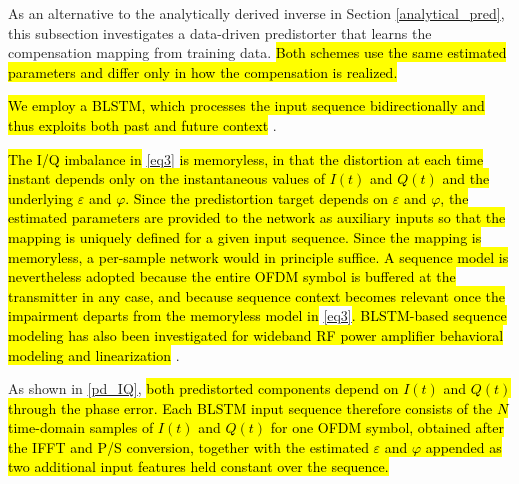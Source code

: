 \documentclass[lettersize,journal]{IEEEtran}
\begin{document}
As an alternative to the analytically derived inverse in Section \ref{analytical_pred}, this subsection investigates a data-driven predistorter that learns the compensation mapping from training data.
\hl{Both schemes use the same estimated parameters and differ only in how the compensation is realized.}

\hl{We employ a BLSTM, which processes the input sequence bidirectionally and thus exploits both past and future context} \cite{REF10}.
 
\hl{The I/Q imbalance in} \eqref{eq3} \hl{is memoryless, in that the distortion at each time instant depends only on the instantaneous values of $I(t)$ and $Q(t)$ and the underlying $\varepsilon$ and $\varphi$.
Since the predistortion target depends on $\varepsilon$ and $\varphi$, the estimated parameters are provided to the network as auxiliary inputs so that the mapping is uniquely defined for a given input sequence.
Since the mapping is memoryless, a per-sample network would in principle suffice.
A sequence model is nevertheless adopted because the entire OFDM symbol is buffered at the transmitter in any case, and because sequence context becomes relevant once the impairment departs from the memoryless model in} \eqref{eq3}\hl{.
BLSTM-based sequence modeling has also been investigated for wideband RF power amplifier behavioral modeling and linearization} \cite{pa_blstm}.

As shown in \eqref{pd_IQ}, \hl{both predistorted components depend on $I(t)$ and $Q(t)$ through the phase error.
Each BLSTM input sequence therefore consists of the $N$ time-domain samples of $I(t)$ and $Q(t)$ for one OFDM symbol, obtained after the IFFT and P/S conversion, together with the estimated $\varepsilon$ and $\varphi$ appended as two additional input features held constant over the sequence.}
\end{document}
